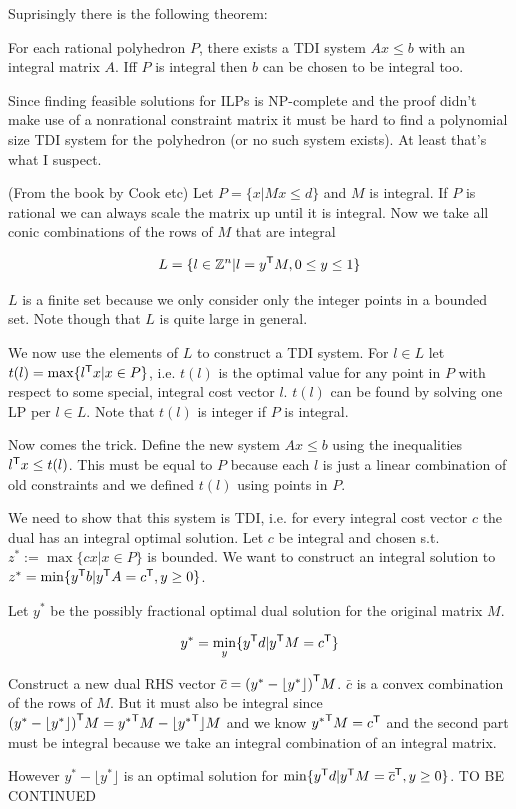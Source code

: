 Suprisingly there is the following theorem:

\begin{thm}\label{existsTDIsystem} For each rational polyhedron $P$, there exists a TDI system $Ax\leq b$ with an integral matrix $A$. Iff $P$ is integral then $b$ can be chosen to be integral too.
\end{thm}

Since finding feasible solutions for ILPs is NP-complete and the proof didn't make use of a nonrational constraint matrix it must be hard to find a polynomial size TDI system for the polyhedron (or no such system exists). At least that's what I suspect.

\begin{pr} (From the book by Cook etc) Let $P=\{x | Mx\leq d\}$ and $M$ is integral. If $P$ is rational we can always scale the matrix up until it is integral. Now we take all conic combinations of the rows of $M$ that are integral

\[L=\{l\in \mathbb{Z}^n | l = {y}^\text{\upshape \sffamily T} M, 0\leq y\leq 1\}\]

$L$ is a finite set because we only consider only the integer points in a bounded set. Note though that $L$ is quite large in general.

We now use the elements of $L$ to construct a TDI system. For $l\in L$ let $t(l) = \max\{{l}^\text{\upshape \sffamily T} x | x\in P\}$, i.e. $t(l)$ is the optimal value for any point in $P$ with respect to some special, integral cost vector $l$. $t(l)$ can be found by solving one LP per $l\in L$. Note that $t(l)$ is integer if $P$ is integral.

Now comes the trick. Define the new system $Ax\leq b$ using the inequalities ${l}^\text{\upshape \sffamily T}x\leq t(l)$. This must be equal to $P$ because each $l$ is just a linear combination of old constraints and we defined $t(l)$ using points in $P$.

We need to show that this system is TDI, i.e. for every integral cost vector $c$ the dual has an integral optimal solution. Let $c$ be integral and chosen s.t. $z^*:=\max \{cx|x\in P\}$ is bounded. We want to construct an integral solution to $z^*=\min \{{y}^\text{\upshape \sffamily T}b | {y}^\text{\upshape \sffamily T} A = {c}^\text{\upshape \sffamily T}, y\geq 0\}$.

Let $y^*$ be the possibly fractional optimal dual solution for the original matrix $M$. 

\[y^* = \underset{y}{\operatorname{min}} \{{y}^\text{\upshape \sffamily T} d| {y}^\text{\upshape \sffamily T} M = {c}^\text{\upshape \sffamily T}\}\]

Construct a new dual RHS vector $\overline c = {(y^*-\lfloor y^*\rfloor)}^\text{\upshape \sffamily T}M$. $\bar c$ is a convex combination of the rows of $M$. But it must also be integral since ${(y^*-\lfloor y^*\rfloor)}^\text{\upshape \sffamily T}M={y^*}^\text{\upshape \sffamily T}M-\lfloor{y^*}^\text{\upshape \sffamily T}\rfloor M$ and we know ${y^*}^\text{\upshape \sffamily T}M={c}^\text{\upshape \sffamily T}$ and the second part must be integral because we take an integral combination of an integral matrix.

However $y^*-\lfloor y^*\rfloor$ is an optimal solution for $\min \{{y}^\text{\upshape \sffamily T} d| {y}^\text{\upshape \sffamily T}M={\overline c}^\text{\upshape \sffamily T},y\geq 0\}$. TO BE CONTINUED
\end{pr}

